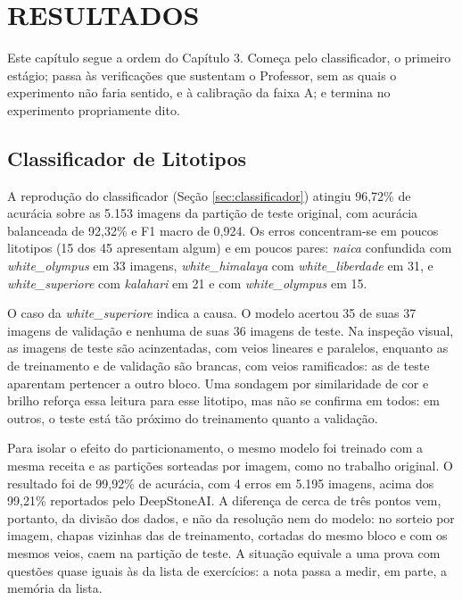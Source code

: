 \chapter[RESULTADOS]{RESULTADOS}

Este capítulo segue a ordem do Capítulo 3. Começa pelo classificador, o primeiro estágio; passa às verificações que sustentam o Professor, sem as quais o experimento não faria sentido, e à calibração da faixa A; e termina no experimento propriamente dito.


\section{Classificador de Litotipos}
\label{sec:res_classificador}

A reprodução do classificador (Seção \ref{sec:classificador}) atingiu 96,72\% de acurácia sobre as 5.153 imagens da partição de teste original, com acurácia balanceada de 92,32\% e F1 macro de 0,924. Os erros concentram-se em poucos litotipos (15 dos 45 apresentam algum) e em poucos pares: \textit{naica} confundida com \textit{white\_olympus} em 33 imagens, \textit{white\_himalaya} com \textit{white\_liberdade} em 31, e \textit{white\_superiore} com \textit{kalahari} em 21 e com \textit{white\_olympus} em 15.

O caso da \textit{white\_superiore} indica a causa. O modelo acertou 35 de suas 37 imagens de validação e nenhuma de suas 36 imagens de teste. Na inspeção visual, as imagens de teste são acinzentadas, com veios lineares e paralelos, enquanto as de treinamento e de validação são brancas, com veios ramificados: as de teste aparentam pertencer a outro bloco. Uma sondagem por similaridade de cor e brilho reforça essa leitura para esse litotipo, mas não se confirma em todos: em outros, o teste está tão próximo do treinamento quanto a validação.

Para isolar o efeito do particionamento, o mesmo modelo foi treinado com a mesma receita e as partições sorteadas por imagem, como no trabalho original. O resultado foi de 99,92\% de acurácia, com 4 erros em 5.195 imagens, acima dos 99,21\% reportados pelo DeepStoneAI. A diferença de cerca de três pontos vem, portanto, da divisão dos dados, e não da resolução nem do modelo: no sorteio por imagem, chapas vizinhas das de treinamento, cortadas do mesmo bloco e com os mesmos veios, caem na partição de teste. A situação equivale a uma prova com questões quase iguais às da lista de exercícios: a nota passa a medir, em parte, a memória da lista.


